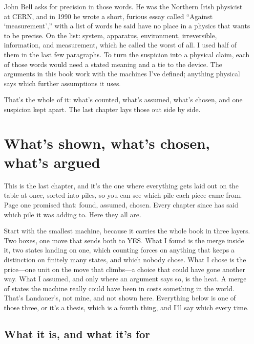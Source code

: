 \documentclass[11pt,twoside]{article}
\theoremstyle{thielethm}
\theoremstyle{thieledef}
\theoremstyle{thieledef}
\theoremstyle{thieledef}
\theoremstyle{thielethm}
\theoremstyle{thieleobs}
\theoremstyle{thielethm}
\begin{document}
John Bell asks for precision in those words. He was the Northern Irish physicist at CERN, and in 1990 he wrote a short, furious essay called ``Against `measurement','' with a list of words he said have no place in a physics that wants to be precise. On the list: system, apparatus, environment, irreversible, information, and measurement, which he called the worst of all. I used half of them in the last few paragraphs. To turn the suspicion into a physical claim, each of those words would need a stated meaning and a tie to the device. The arguments in this book work with the machines I've defined; anything physical says which further assumptions it uses.

That's the whole of it: what's counted, what's assumed, what's chosen, and one suspicion kept apart. The last chapter lays those out side by side.

\section{What's shown, what's chosen, what's argued}
\label{sec:shown-chosen}

This is the last chapter, and it's the one where everything gets laid out on the table at once, sorted into piles, so you can see which pile each piece came from. Page one promised that: found, assumed, chosen. Every chapter since has said which pile it was adding to. Here they all are.

Start with the smallest machine, because it carries the whole book in three layers. Two boxes, one move that sends both to YES. What I found is the merge inside it, two states landing on one, which counting forces on anything that keeps a distinction on finitely many states, and which nobody chose. What I chose is the price---one unit on the move that climbs---a choice that could have gone another way. What I assumed, and only where an argument says so, is the heat. A merge of states the machine really could have been in costs something in the world. That's Landauer's, not mine, and not shown here. Everything below is one of those three, or it's a thesis, which is a fourth thing, and I'll say which every time.

\subsection{What it is, and what it's for}
\end{document}
